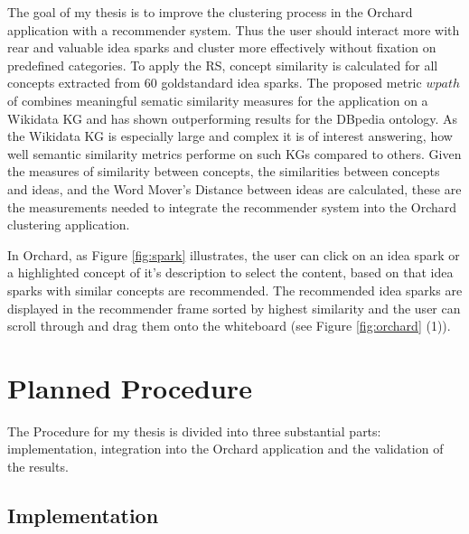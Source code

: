 \documentclass[pdftex,a4paper,12pt]{scrartcl}
\theoremstyle{definition}
\begin{document}
The goal of my thesis is to improve the clustering process in the Orchard application with a recommender system. Thus the user should interact more with rear and valuable idea sparks and cluster more effectively without fixation on predefined categories. To apply the RS, concept similarity is calculated for all concepts extracted from 60 goldstandard idea sparks. The proposed metric $wpath$ of \citet{zhu_computing_2017} combines meaningful sematic similarity measures for the application on a Wikidata KG and has shown outperforming results for the DBpedia ontology. As the Wikidata KG is especially large and complex it is of interest answering, how well semantic similarity metrics performe on such KGs compared to others. 
Given the measures of similarity between concepts, the similarities between concepts and ideas, and the Word Mover's Distance between ideas are calculated, these are the measurements needed to integrate the recommender system into the Orchard clustering application.

In Orchard, as Figure \ref{fig:spark} illustrates, the user can click on an idea spark or a highlighted concept of it's description to select the content, based on that idea sparks with similar concepts are recommended. The recommended idea sparks are displayed in the recommender frame sorted by highest similarity and the user can scroll through and drag them onto the whiteboard (see Figure \ref{fig:orchard} (1)).


    

\section{Planned Procedure}
    The Procedure for my thesis is divided into three substantial parts: implementation, integration into the Orchard application and the validation of the results. 
    \subsection{Implementation}
    
\end{document}
